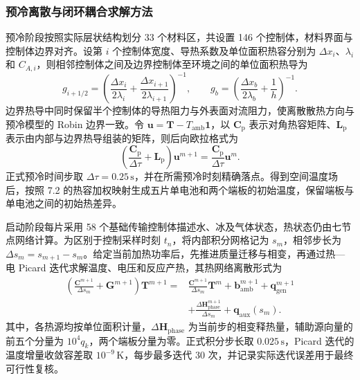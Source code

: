 \subsubsection{预冷离散与闭环耦合求解方法}
预冷阶段按照实际层状结构划分 33 个材料区，共设置 146 个控制体，材料界面与控制体边界对齐。设第 \(i\) 个控制体宽度、导热系数及单位面积热容分别为 \(\Delta x_i\)、\(\lambda_i\) 和 \(C_{A,i}\)，则相邻控制体之间及边界控制体至环境之间的单位面积热导为
\begin{equation}
g_{i+1/2}=\left(\frac{\Delta x_i}{2\lambda_i}+\frac{\Delta x_{i+1}}{2\lambda_{i+1}}\right)^{-1},\qquad
g_b=\left(\frac{\Delta x_b}{2\lambda_b}+\frac{1}{h}\right)^{-1}.
\tag{7-@@4@@}\label{eq:q4:solver_precool_conductance}
\end{equation}
边界热导中同时保留半个控制体的导热阻力与外表面对流阻力，使离散散热方向与预冷模型的 Robin 边界一致。令 \(\boldsymbol{u}=\boldsymbol{T}-T_{\mathrm{amb}}\boldsymbol{1}\)，以 \(\mathbf C_{\mathrm p}\) 表示对角热容矩阵、\(\mathbf L_{\mathrm p}\) 表示由内部与边界热导组装的矩阵，则后向欧拉格式为
\begin{equation}
\left(\frac{\mathbf C_{\mathrm p}}{\Delta\tau}+\mathbf L_{\mathrm p}\right)
\boldsymbol{u}^{m+1}=\frac{\mathbf C_{\mathrm p}}{\Delta\tau}\boldsymbol{u}^{m}.
\tag{7-@@5@@}\label{eq:q4:solver_precool_be}
\end{equation}
正式预冷时间步取 \(\Delta\tau=0.25\,\mathrm s\)，并在所需预冷时刻精确落点。得到空间温度场后，按照 7.2 的热容加权映射生成五片单电池和两个端板的初始温度，保留端板与单电池之间的初始热差异。

启动阶段每片采用 58 个基础传输控制体描述水、冰及气体状态，热状态仍由七节点网络计算。为区别于控制采样时刻 \(t_n\)，将内部积分网格记为 \(s_m\)，相邻步长为 \(\Delta s_m=s_{m+1}-s_m\)。给定当前加热功率后，先推进质量迁移与相变，再通过热—电 Picard 迭代求解温度、电压和反应产热，其热网络离散形式为
\begin{equation}
\begin{aligned}
\left(\frac{\mathbf C^{m+1}}{\Delta s_m}+\mathbf G^{m+1}\right)
\boldsymbol{T}^{m+1}
={}&\frac{\mathbf C^{m+1}}{\Delta s_m}\boldsymbol{T}^{m}
+\boldsymbol b_{\mathrm{amb}}^{m+1}+\boldsymbol q_{\mathrm{gen}}^{m+1}\\
&+\frac{\Delta\boldsymbol H_{\mathrm{phase}}^{m+1}}{\Delta s_m}
+\boldsymbol q_{\mathrm{aux}}(s_m).
\end{aligned}
\tag{7-@@6@@}\label{eq:q4:solver_startup_be}
\end{equation}
其中，各热源均按单位面积计量，\(\Delta\boldsymbol H_{\mathrm{phase}}\) 为当前步的相变释热量，辅助源向量的前五个分量为 \(10^4q_k\)，两个端板分量为零。正式积分步长取 \(0.025\,\mathrm s\)，Picard 迭代的温度增量收敛容差取 \(10^{-9}\,\mathrm K\)，每步最多迭代 30 次，并记录实际迭代误差用于最终可行性复核。

